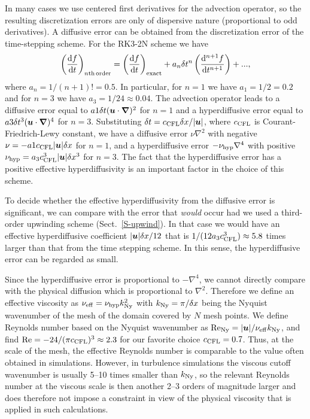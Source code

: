 \documentclass[\mydriver,12pt,twoside,notitlepage,a4paper]{article}
\renewcommand{\vec}[1]{\mbox{\boldmath{$#1$}}}
\newcommand{\uv}            {\vec{u}}
\newcommand{\nab}{\mbox{\boldmath $\nabla$} {}}
\newcommand{\dd}{{\rm d} {}}
\begin{document}
In many cases we use centered first derivatives for the advection
operator, so the resulting discretization errors are only of
dispersive nature (proportional to odd derivatives).
A diffusive error can be obtained from the discretization error
of the time-stepping scheme.
For the RK3-2N scheme we have
\begin{equation}
\left({\dd f\over\dd t}\right)_{n\rm th\,order}
=\left({\dd f\over\dd t}\right)_{\rm exact}
+a_n\delta t^n\left({\dd^{n+1} f\over\dd t^{n+1}}\right)+...,
\end{equation}
where $a_n=1/(n+1)!=0.5$.
In particular, for $n=1$ we have $a_1=1/2=0.2$ and
for $n=3$ we have $a_3=1/24\approx0.04$.
The advection operator leads to a diffusive error equal to
$a1\delta t(\uv\cdot\nab)^2$ for $n=1$ and a
hyperdiffusive error equal to
$a3\delta t^3(\uv\cdot\nab)^4$ for $n=3$.
Substituting $\delta t=c_{\rm CFL}\delta x/|\uv|$,
where $c_{\rm CFL}$ is Courant-Friedrich-Lewy constant,
we have a diffusive error $\nu\nabla^2$ with negative
$\nu=-a1 c_{\rm CFL}|\uv|\delta x$ for $n=1$,
and a hyperdiffusive error $-\nu_{\rm hyp}\nabla^4$ with positive
$\nu_{\rm hyp}=a_3 c_{\rm CFL}^3 |\uv|\delta x^3$ for $n=3$.
The fact that the hyperdiffusive error has a positive effective
hyperdiffusivity is an important factor in the choice of this scheme.

To decide whether the effective hyperdiffusivity from the diffusive
error is significant, we can compare with the error that {\em would}
occur had we used a third-order upwinding scheme (Sect.~\ref{S-upwind}).
In that case we would have an effective hyperdiffusive coefficient
$|\uv|\delta x/12$ that is $1/(12a_3 c_{\rm CFL}^3)\approx5.8$ times
larger than that from the time stepping scheme.
In this sense, the hyperdiffusive error can be regarded as small.

Since the hyperdiffusive error is proportional to $-\nabla^4$,
we cannot directly compare with the physical diffusion which is
proportional to $\nabla^2$.
Therefore we define an effective viscosity as
$\nu_{\rm eff}=\nu_{\rm hyp}k_{\rm Ny}^2$ with $k_{\rm Ny}=\pi/\delta x$
being the Nyquist wavenumber of the mesh
of the domain covered by $N$ mesh points.
We define Reynolds number based on the Nyquist wavenumber as
$\mbox{Re}_{\rm Ny}=|\uv|/\nu_{\rm eff} k_{\rm Ny}$,
and find $\mbox{Re}=-24/(\pi c_{\rm CFL})^3\approx 2.3$
for our favorite choice $c_{\rm CFL}=0.7$.
Thus, at the scale of the mesh, the effective Reynolds number
is comparable to the value often obtained in simulations.
However, in turbulence simulations the viscous cutoff wavenumber
is usually 5--10 times smaller than $k_{\rm Ny}$, so the relevant
Reynolds number at the viscous scale is then another 2--3 orders
of magnitude larger and does therefore not impose a constraint
in view of the physical viscosity that is applied in such calculations.
\end{document}
